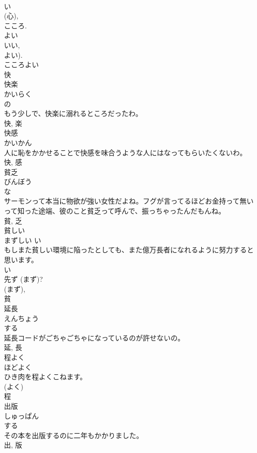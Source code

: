 \documentclass[8pt]{extreport}
\begin{document}
\begin{CJK}{UTF8}{min}
\\	い 
\\	(心), 
\\	こころ. 
\\	よい 
\\	いい, 
\\	よい). 
\\	こころよい 
\\	快	
\\	快楽	
\\	かいらく	
\\	の 
\\	もう少しで、快楽に溺れるところだったわ。	
\\	快, 楽	
\\	快感	
\\	かいかん	
\\	人に恥をかかせることで快感を味合うような人にはなってもらいたくないわ。	
\\	快, 感	
\\	貧乏	
\\	びんぼう	
\\	な 
\\	サーモンって本当に物欲が強い女性だよね。フグが言ってるほどお金持って無いって知った途端、彼のこと貧乏って呼んで、振っちゃったんだもんね。	
\\	貧, 乏	
\\	貧しい	
\\	まずしい	い 
\\	もしまた貧しい環境に陥ったとしても、また億万長者になれるように努力すると思います。	
\\	い 
\\	先ず (まず)? 
\\	(まず), 
\\	貧	
\\	延長	
\\	えんちょう	
\\	する 
\\	延長コードがごちゃごちゃになっているのが許せないの。	
\\	延, 長	
\\	程よく	
\\	ほどよく	
\\	ひき肉を程よくこねます。	
\\	(よく) 
\\	程	
\\	出版	
\\	しゅっぱん	
\\	する 
\\	その本を出版するのに二年もかかりました。	
\\	出, 版	

\end{CJK}
\end{document}
